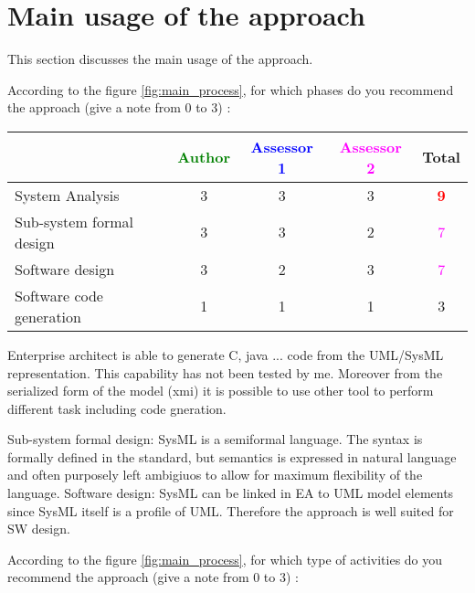 \section{Main usage of the approach}
\label{main_usage}
This section discusses the main usage of the approach.

According to the figure \ref{fig:main_process}, for which phases do you recommend the approach (give a note from 0 to  3) :

\begin{tabular}{|l | c | c | c | c|}
\hline
& \textcolor{green}{Author} & \textcolor{blue}{Assessor 1} & \textcolor{magenta}{Assessor 2} & Total \\
\hline 
System Analysis & 3     & 3    & 3    & \textcolor{red}{\textbf{9}} \\
\hline
Sub-system formal design & 3    & 3    & 2    & \textcolor{magenta}{7} \\
\hline
Software design & 3    & 2    & 3    & \textcolor{magenta}{7} \\
\hline
Software code generation & 1    & 1    & 1    & 3    \\
\hline
\end{tabular}
\begin{author_comment}
Enterprise architect is able to generate C, java ... code from the UML/SysML
representation. This capability has not been tested by me. Moreover
from the serialized form of the model (xmi) it is possible to use
other tool to perform different task including code gneration.
\end{author_comment}
\begin{assessor2}
Sub-system formal design: SysML is a semiformal language. The syntax is formally defined in the standard, but semantics is expressed in natural language and often purposely left ambigiuos to allow for maximum flexibility of the language.
Software design: SysML can be linked in EA to UML model elements since SysML itself is a profile of UML. Therefore the approach is well suited for SW design.
\end{assessor2}

According to the figure \ref{fig:main_process}, for which type of activities do you recommend the approach (give a note from 0 to  3) :

